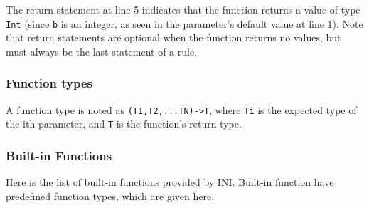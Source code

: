 \documentclass[11pt]{article}
\begin{document}
The return statement at line 5 indicates that the function returns a value of type \texttt{Int} (since \texttt{b} is an integer, as seen in the parameter's default value at line 1). Note that return statements are optional when the function returns no values, but must always be the last statement of a rule.

\subsubsection{Function types}

A function type is noted as \texttt{(T1,T2,...TN)->T}, where \texttt{Ti} is the expected type of the ith parameter, and \texttt{T} is the function's return type.

\subsubsection{Built-in Functions\label{sec:built_in_functions} }

Here is the list of built-in functions provided by INI. Built-in function have predefined function types, which are given here.
\end{document}
